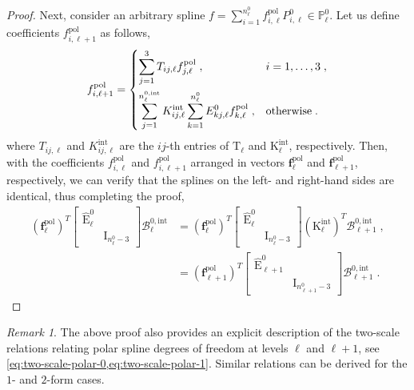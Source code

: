 \documentclass[10pt]{article}
\newcommand{\mbf}[1]{{\boldsymbol{#1}}}
\newcommand{\basis}[1]{\mathcal{#1}}
\newcommand{\vSpace}[1]{\mathbb{#1}}
\newcommand{\mat}[1]{\mbf{\mathrm{#1}}}
\newcommand{\bsp}{B}
\newcommand{\bspB}{\basis{\bsp}}
\newcommand{\polar}{P}
\newcommand{\polarS}{\vSpace{\polar}}
\newcommand{\tint}{\mathrm{int}}
\newcommand{\tpolar}{\mathrm{pol}}
\theoremstyle{plain}
\theoremstyle{definition}
\theoremstyle{remark}
\newtheorem{remark}{Remark}[section]
\begin{document}
\begin{proof}
    Next, consider an arbitrary spline $f = \sum_{i=1}^{n^0_\ell} f^\tpolar_{i,\ell} \polar^0_{i,\ell} \in \polarS^0_\ell$.
    Let us define coefficients $f^\tpolar_{i,\ell+1}$ as follows,
    \begin{equation}\label{eq:two-scale-polar-1}
        f^\tpolar_{i,\ell+1} =
        \begin{dcases}
            \sum_{j=1}^3 T_{ij,\ell}f^\tpolar_{j,\ell}\;,& i = 1, \dots, 3\;,\\
            \sum_{j=1}^{n^{0,\tint}_\ell} K^{\tint}_{ij,\ell} \sum_{k=1}^{n^{0}_\ell} E^0_{kj,\ell}f^\tpolar_{k,\ell}\;,&\text{otherwise}\;.
        \end{dcases}
    \end{equation}
    where $T_{ij,\ell}$ and $K^{\tint}_{ij,\ell}$ are the $ij$-th entries of $\mat{T}_{\ell}$ and $\mat{K}^{\tint}_{\ell}$, respectively.
    Then, with the coefficients $f^\tpolar_{i,\ell}$ and $f^\tpolar_{i,\ell+1}$ arranged in vectors $\mbf{f}^\tpolar_\ell$ and $\mbf{f}^\tpolar_{\ell+1}$, respectively, we can verify that the splines on the left- and right-hand sides are identical, thus completing the proof,
    \begin{equation*}
        \begin{split}
        \left(\mbf{f}^\tpolar_\ell\right)^T
        \begin{bmatrix}
            \widehat{\mat{E}}^0_{\ell} &\\
            & \mat{I}_{n^0_{\ell}-3}
        \end{bmatrix}
        \bspB^{0,\tint}_\ell
        &=
        \left(\mbf{f}^\tpolar_\ell\right)^T
        \begin{bmatrix}
            \widehat{\mat{E}}^0_{\ell} &\\
            & \mat{I}_{n^0_{\ell}-3}
        \end{bmatrix}
        \left(\mat{K}^{\tint}_{\ell}\right)^T\bspB^{0,\tint}_{\ell+1}\;,\\
        &=
        \left(\mbf{f}^\tpolar_{\ell+1}\right)^T
        \begin{bmatrix}
            \widehat{\mat{E}}^0_{\ell+1} &\\
            & \mat{I}_{n^0_{\ell+1}-3}
        \end{bmatrix}
        \bspB^{0,\tint}_{\ell+1}\;.
        \end{split}
    \end{equation*}
\end{proof}

\begin{remark}
    The above proof also provides an explicit description of the two-scale relations relating polar spline degrees of freedom at levels $\ell$ and $\ell+1$, see \cref{eq:two-scale-polar-0,eq:two-scale-polar-1}.
    Similar relations can be derived for the $1$- and $2$-form cases.
\end{remark}
\end{document}
